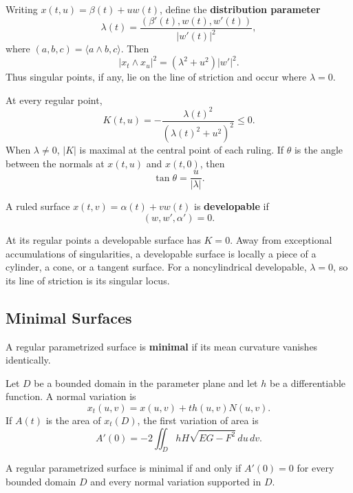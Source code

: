 \documentclass[12pt, oneside]{book}
\begin{document}
Writing $x(t,u)=\beta(t)+uw(t)$, define the \textbf{distribution parameter}
\[
    \lambda(t)=\frac{(\beta'(t),w(t),w'(t))}{|w'(t)|^2},
\]
where $(a,b,c)=\langle a\wedge b,c\rangle$.  Then
\[
    |x_t\wedge x_u|^2=(\lambda^2+u^2)|w'|^2.
\]
Thus singular points, if any, lie on the line of striction and occur where
$\lambda=0$.

At every regular point,
\begin{equation}
    K(t,u)=-\frac{\lambda(t)^2}{(\lambda(t)^2+u^2)^2}\leq0.
    \label{eq:ruled-curvature}
\end{equation}
When $\lambda\neq0$, $|K|$ is maximal at the central point of each ruling.
If $\theta$ is the angle between the normals at $x(t,u)$ and $x(t,0)$, then
\[
    \tan\theta=\frac{u}{|\lambda|}.
\]

\begin{definition}
    A ruled surface $x(t,v)=\alpha(t)+vw(t)$ is \textbf{developable} if
    \[
        (w,w',\alpha')=0.
    \]
\end{definition}

At its regular points a developable surface has $K=0$.  Away from exceptional
accumulations of singularities, a developable surface is locally a piece of a
cylinder, a cone, or a tangent surface.  For a noncylindrical developable,
$\lambda=0$, so its line of striction is its singular locus.

\subsection{Minimal Surfaces}

\begin{definition}
    A regular parametrized surface is \textbf{minimal} if its mean curvature
    vanishes identically.
\end{definition}

Let $D$ be a bounded domain in the parameter plane and let $h$ be a
differentiable function.  A normal variation is
\[
    x_t(u,v)=x(u,v)+t h(u,v)N(u,v).
\]
If $A(t)$ is the area of $x_t(D)$, the first variation of area is
\begin{equation}
    A'(0)=-2\iint_D hH\sqrt{EG-F^2}\,du\,dv.
    \label{eq:first-variation-area}
\end{equation}

\begin{proposition}
    A regular parametrized surface is minimal if and only if
    $A'(0)=0$ for every bounded domain $D$ and every normal variation
    supported in $D$.
\end{proposition}
\end{document}
